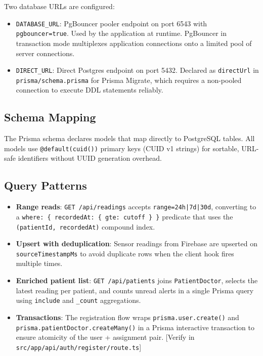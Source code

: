 \documentclass[12pt,a4paper]{report}
\begin{document}
Two database URLs are configured:

\begin{itemize}[leftmargin=1.5em]
  \item \texttt{DATABASE\_URL}: PgBouncer pooler endpoint on port 6543
        with \texttt{pgbouncer=true}. Used by the application at runtime.
        PgBouncer in transaction mode multiplexes application connections
        onto a limited pool of server connections.

  \item \texttt{DIRECT\_URL}: Direct Postgres endpoint on port 5432.
        Declared as \texttt{directUrl} in \texttt{prisma/schema.prisma}
        for Prisma Migrate, which requires a non-pooled connection to
        execute DDL statements reliably.
\end{itemize}

\subsection{Schema Mapping}

The Prisma schema declares models that map directly to PostgreSQL tables.
All models use \texttt{@default(cuid())} primary keys (CUID v1 strings)
for sortable, URL-safe identifiers without UUID generation overhead.

\subsection{Query Patterns}

\begin{itemize}[leftmargin=1.5em]
  \item \textbf{Range reads}: \texttt{GET /api/readings} accepts
        \texttt{range=24h|7d|30d}, converting to a
        \texttt{where: \{ recordedAt: \{ gte: cutoff \} \}} predicate
        that uses the \texttt{(patientId, recordedAt)} compound index.

  \item \textbf{Upsert with deduplication}: Sensor readings from
        Firebase are upserted on \texttt{sourceTimestampMs} to avoid
        duplicate rows when the client hook fires multiple times.

  \item \textbf{Enriched patient list}: \texttt{GET /api/patients} joins
        \texttt{PatientDoctor}, selects the latest reading per patient,
        and counts unread alerts in a single Prisma query using
        \texttt{include} and \texttt{\_count} aggregations.

  \item \textbf{Transactions}: The registration flow wraps
        \texttt{prisma.user.create()} and
        \texttt{prisma.patientDoctor.createMany()} in a Prisma
        interactive transaction to ensure atomicity of the user +
        assignment pair. [Verify in \texttt{src/app/api/auth/register/route.ts}]
\end{itemize}
\end{document}
